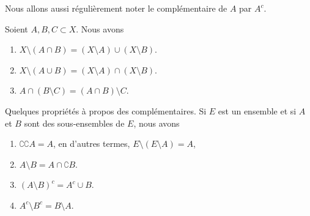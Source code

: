 Nous allons aussi régulièrement noter le complémentaire de \( A\) par \( A^c\).

\begin{lemma}       \label{LEMooHRKAooRskzQL}
	Soient \( A,B,C\subset X\). Nous avons
	\begin{enumerate}
		\item
		      \( X\setminus (A\cap B)=(X\setminus A)\cup(X\setminus B)\).
		\item       \label{ITEMooQCGUooKnWfBo}
		      \( X\setminus (A\cup B)=(X\setminus A)\cap(X\setminus B)\).
		\item       \label{ITEMooXWKCooUASxlh}
		      \( A\cap(B\setminus C)=(A\cap B)\setminus C\).
	\end{enumerate}
\end{lemma}

\begin{lemma}       \label{LemPropsComplement}
	Quelques propriétés à propos des complémentaires. Si \( E\) est un ensemble et si \( A\) et \( B\) sont des sous-ensembles de \( E\), nous avons
	\begin{enumerate}
		\item
		      \( \complement \complement A =A\), en d'autres termes, \( E\setminus(E\setminus A)=A\),
		\item       \label{ItemLemPropComplementiii}
		      \( A\setminus B=A\cap\complement B\).
		\item       \label{ITEMooNHDUooWtURqQ}
		      \( (A\setminus B)^c=A^c\cup B\).
		\item       \label{ITEMooTBWKooTChOmC}
		      \( A^c\setminus B^c=B\setminus A\).
	\end{enumerate}
\end{lemma}

